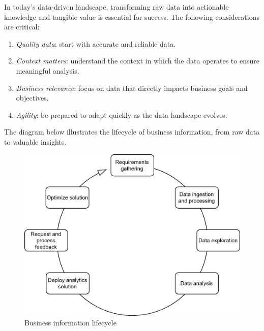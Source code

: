 In today's data-driven landscape, transforming raw data into actionable knowledge and tangible value is essential for success. 
The following considerations are critical:
\begin{enumerate}
    \item \textit{Quality data}: start with accurate and reliable data.
    \item \textit{Context matters}: understand the context in which the data operates to ensure meaningful analysis.
    \item \textit{Business relevance}: focus on data that directly impacts business goals and objectives.
    \item \textit{Agility}: be prepared to adapt quickly as the data landscape evolves.
\end{enumerate}

The diagram below illustrates the lifecycle of business information, from raw data to valuable insights.

\begin{figure}[H]
    \centering
    \includegraphics[width=0.5\linewidth]{images/bis7.png}
    \caption{Business information lifecycle}
\end{figure}